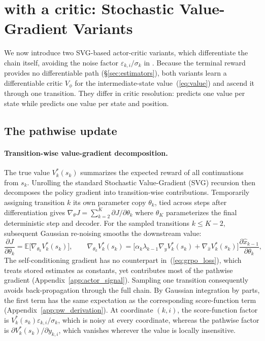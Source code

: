 \section{\method{} with a critic: Stochastic Value-Gradient Variants}
\label{sec:method}
We now introduce two SVG-based actor-critic variants, which differentiate the chain itself, avoiding the noise factor $\varepsilon_{k,i}/\sigma_k$ in \methodGRPO{}. Because the terminal reward provides no differentiable path (\S\ref{sec:estimators}), both variants learn a differentiable critic $V_\phi$ for the intermediate-state value~(\ref{eq:value}) and ascend it through one transition. They differ in critic resolution: \methodSVGScalar{} predicts one value per state while \methodSVGTwoD{} predicts one value per state and position.
\subsection{The pathwise update}
\label{sec:pathwise}
\paragraph{Transition-wise value-gradient decomposition.}
The true value $V_k^*(s_k)$ summarizes the expected reward of all continuations from $s_k$. Unrolling the standard Stochastic Value-Gradient (SVG) recursion \citep{heess2015svg} then decomposes the policy gradient into transition-wise contributions. Temporarily assigning transition $k$ its own parameter copy $\theta_k$, tied across steps after differentiation gives $\nabla_\theta J=\sum_{k=2}^{K}\partial J/\partial\theta_k$ where $\theta_K$ parameterizes the final deterministic step and decoder. For the sampled transitions $k\le K-2$, subsequent Gaussian re-noising smooths the downstream value:
\begin{equation}
\frac{\partial J}{\partial\theta_k}=\mathbb E\big[\nabla_{\theta_k}V_k^*(s_k)\big],\qquad \nabla_{\theta_k}V_k^*(s_k)=\Big[\alpha_k\lambda_{k-1}\nabla_{y}V_k^*(s_k)+\nabla_{\hat x}V_k^*(s_k)\Big]\frac{\partial\hat x_{k-1}}{\partial\theta_k},
\label{eq:pw_exact}
\end{equation}
The self-conditioning gradient has no counterpart in~(\ref{eq:grpo_loss}), which treats stored estimates as constants, yet contributes most of the pathwise gradient (Appendix~\ref{app:actor_signal}). Sampling one transition consequently avoids back-propagation through the full chain. By Gaussian integration by parts, the first term has the same expectation as the corresponding score-function term (Appendix~\ref{app:pw_derivation}). At coordinate $(k,i)$, the score-function factor is $V_k^*(s_k)\varepsilon_{k,i}/\sigma_k$, which is noisy at every coordinate, whereas the pathwise factor is $\partial V_k^*(s_k)/\partial y_{k,i}$, which vanishes wherever the value is locally insensitive.

